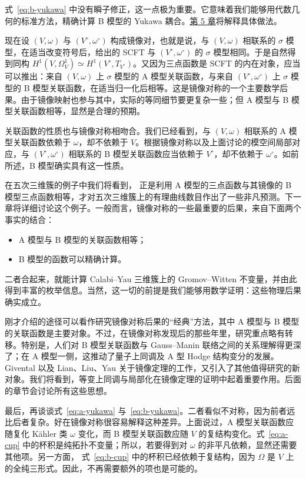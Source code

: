 式~\eqref{eq:b-yukawa} 中没有瞬子修正，这一点极为重要。它意味着我们能够用代数几何的标准方法，精确计算 B 模型的 Yukawa 耦合。\hyperref[chap:hodge-yukawa]{第 5 章}将解释具体做法。

现在设 $(V,\omega)$ 与 $(V^\circ,\omega^\circ)$ 构成镜像对，也就是说，与 $(V,\omega)$ 相联系的 $\sigma$ 模型，在适当改变符号后，给出的 SCFT 与 $(V^\circ,\omega^\circ)$ 的 $\sigma$ 模型相同。于是自然得到同构 $H^1(V,\Omega_V^1)\simeq H^1(V^\circ,T_{V^\circ})$。又因为三点函数是 SCFT 的内在对象，应当可以推出：来自 $(V,\omega)$ 上 $\sigma$ 模型的 A 模型关联函数，与来自 $(V^\circ,\omega^\circ)$ 上 $\sigma$ 模型的 B 模型关联函数，在适当归一化后相等。这是镜像对称的一个主要数学后果。由于镜像映射也参与其中，实际的等同细节要更复杂一些；但 A 模型与 B 模型关联函数相等，显然是合理的预期。

关联函数的性质也与镜像对称相吻合。我们已经看到，与 $(V,\omega)$ 相联系的 A 模型关联函数依赖于 $\omega$，却不依赖于 $V$。根据镜像对称以及上面讨论的模空间局部对应，与 $(V^\circ,\omega^\circ)$ 相联系的 B 模型关联函数应当依赖于 $V^\circ$，却不依赖于 $\omega^\circ$。如前所述，B 模型确实具有这一性质。

在五次三维簇的例子中我们将看到， 正是利用 A 模型的三点函数与其镜像的 B 模型三点函数相等，才对五次三维簇上的有理曲线数目作出了一些非凡预测。下一章将详细讨论这个例子。一般而言，镜像对称的一些最重要的后果，来自下面两个事实的结合：
\begin{itemize}
\item A 模型与 B 模型的关联函数相等；
\item B 模型的函数可以精确计算。
\end{itemize}
二者合起来，就能计算 Calabi--Yau 三维簇上的 Gromov--Witten 不变量，并由此得到丰富的枚举信息。当然，这一切的前提是我们能够用数学证明：这些物理后果确实成立。

刚才介绍的途径可以看作研究镜像对称后果的“经典”方法，其中 A 模型与 B 模型的关联函数是主要对象。不过，在镜像对称发现后的那些年里，研究重点略有转移。特别是，人们对 B 模型关联函数与 Gauss--Manin 联络之间的关系理解得更深了；在 A 模型一侧，这推动了量子上同调及 A 型 Hodge 结构变分的发展。Givental 以及 Lian、Liu、Yau 关于镜像定理的工作，又引入了其他值得研究的新对象。我们将看到，等变上同调与局部化在镜像定理的证明中起着重要作用。后面的章节会讨论所有这些思想。

最后，再谈谈式~\eqref{eq:a-yukawa} 与~\eqref{eq:b-yukawa}。二者看似不对称，因为前者远比后者复杂。好在镜像对称很容易解释这种差异。上面说过，A 模型关联函数应随复化 Kähler 类 $\omega$ 变化，而 B 模型关联函数应随 $V$ 的复结构变化。式~\eqref{eq:a-cup} 中的杯积是纯拓扑不变量；所以，若要得到对 $\omega$ 的非平凡依赖，显然还需要其他项。另一方面，
式~\eqref{eq:b-cup} 中的杯积已经依赖于复结构，因为 $\Omega$ 是 $V$ 上的全纯三形式。因此，不再需要额外的项也是可能的。

